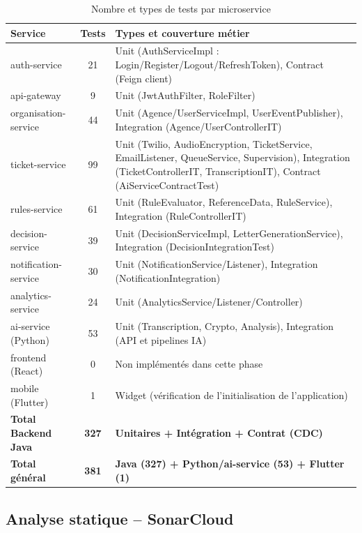 \begin{table}[H]
\centering
\caption{Nombre et types de tests par microservice}
\label{tab:tests}
\begin{tabular}{|p{4.2cm}|c|p{7.8cm}|}
\hline
\textbf{Service} & \textbf{Tests} & \textbf{Types et couverture m\'{e}tier} \\
\hline
auth-service & 21 & Unit (AuthServiceImpl : Login/Register/Logout/RefreshToken), Contract (Feign client) \\
\hline
api-gateway & 9 & Unit (JwtAuthFilter, RoleFilter) \\
\hline
organisation-service & 44 & Unit (Agence/UserServiceImpl, UserEventPublisher), Integration (Agence/UserControllerIT) \\
\hline
ticket-service & 99 & Unit (Twilio, AudioEncryption, TicketService, EmailListener, QueueService, Supervision), Integration (TicketControllerIT, TranscriptionIT), Contract (AiServiceContractTest) \\
\hline
rules-service & 61 & Unit (RuleEvaluator, ReferenceData, RuleService), Integration (RuleControllerIT) \\
\hline
decision-service & 39 & Unit (DecisionServiceImpl, LetterGenerationService), Integration (DecisionIntegrationTest) \\
\hline
notification-service & 30 & Unit (NotificationService/Listener), Integration (NotificationIntegration) \\
\hline
analytics-service & 24 & Unit (AnalyticsService/Listener/Controller) \\
\hline
ai-service (Python) & 53 & Unit (Transcription, Crypto, Analysis), Integration (API et pipelines IA) \\
\hline
frontend (React) & 0 & Non impl\'{e}ment\'{e}s dans cette phase \\
\hline
mobile (Flutter) & 1 & Widget (v\'{e}rification de l'initialisation de l'application) \\
\hline
\textbf{Total Backend Java} & \textbf{327} & \textbf{Unitaires + Int\'{e}gration + Contrat (CDC)} \\
\hline
\textbf{Total g\'{e}n\'{e}ral} & \textbf{381} & \textbf{Java (327) + Python/ai-service (53) + Flutter (1)} \\
\hline
\end{tabular}
\end{table}

\subsection{Analyse statique -- SonarCloud}

